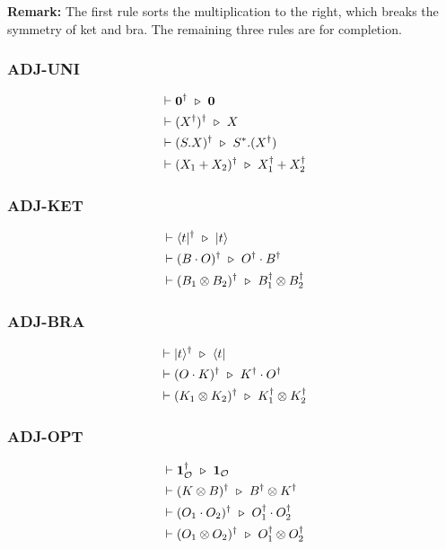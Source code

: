 \textbf{Remark: } The first rule sorts the multiplication to the right, which breaks the symmetry of ket and bra. The remaining three rules are for completion.

\subsubsection*{\textsf{ADJ-UNI}}
\begin{align*}
  & \vdash \textbf{0}^\dagger \ \triangleright\  \textbf{0} \\
  & \vdash (X^\dagger)^\dagger \ \triangleright\  X \\
  & \vdash (S.X)^\dagger \ \triangleright\  S^*.(X^\dagger) \\
  & \vdash (X_1 + X_2)^\dagger \ \triangleright\  X_1^\dagger + X_2^\dagger\\
\end{align*}

\subsubsection*{\textsf{ADJ-KET}}
\begin{align*}
  & \vdash \langle t|^\dagger \ \triangleright\  |t\rangle\\
  & \vdash (B \cdot O)^\dagger \ \triangleright\  O^\dagger \cdot B^\dagger \\
  & \vdash (B_1 \otimes B_2)^\dagger \ \triangleright\  B_1^\dagger \otimes B_2^\dagger
\end{align*}

\subsubsection*{\textsf{ADJ-BRA}}
\begin{align*}
  & \vdash |t\rangle^\dagger \ \triangleright\  \langle t|\\
  & \vdash (O \cdot K)^\dagger \ \triangleright\  K^\dagger \cdot O^\dagger \\
  & \vdash (K_1 \otimes K_2)^\dagger \ \triangleright\  K_1^\dagger \otimes K_2^\dagger
\end{align*}

\subsubsection*{\textsf{ADJ-OPT}}
\begin{align*}
  & \vdash \mathbf{1}_\mathcal{O}^\dagger \ \triangleright\  \mathbf{1}_\mathcal{O}\\
  & \vdash (K \otimes B)^\dagger \ \triangleright\  B^\dagger \otimes K^\dagger \\
  & \vdash (O_1 \cdot O_2)^\dagger \ \triangleright\  O_1^\dagger \cdot O_2^\dagger \\
  & \vdash (O_1 \otimes O_2)^\dagger \ \triangleright\  O_1^\dagger \otimes O_2^\dagger
\end{align*}


